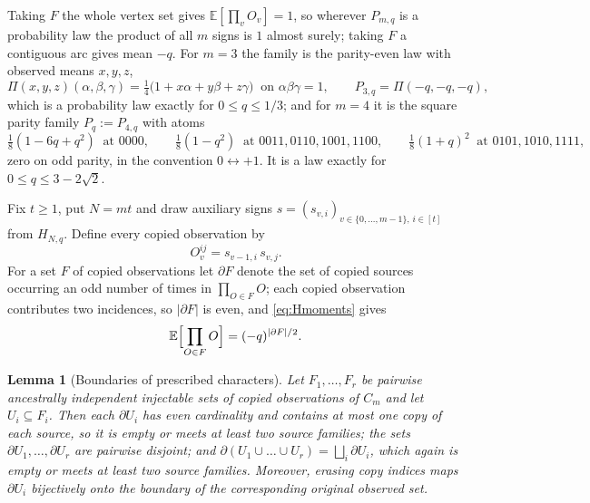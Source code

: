 \documentclass[11pt]{article}
\theoremstyle{plain}
\newtheorem{lemma}[theorem]{Lemma}
\theoremstyle{definition}
\newcommand{\E}{\mathbb E}
\begin{document}
Taking $F$ the whole vertex set gives $\E[\prod_vO_v]=1$, so wherever $P_{m,q}$ is a probability law the product of all $m$ signs is $1$ almost surely; taking $F$ a contiguous arc gives mean $-q$. For $m=3$ the family is the parity-even law with observed means $x,y,z$,
\begin{equation}\label{eq:paritylaw}
\Pi(x,y,z)(\alpha,\beta,\gamma)=\tfrac14\bigl(1+x\alpha+y\beta+z\gamma\bigr)\ \text{ on }\alpha\beta\gamma=1,\qquad P_{3,q}=\Pi(-q,-q,-q),
\end{equation}
which is a probability law exactly for $0\le q\le1/3$; and for $m=4$ it is the square parity family $P_q:=P_{4,q}$ with atoms
\begin{equation}\label{eq:squaretarget}
\tfrac18(1-6q+q^2)\ \text{ at }0000,\qquad
\tfrac18(1-q^2)\ \text{ at }0011,0110,1001,1100,\qquad
\tfrac18(1+q)^2\ \text{ at }0101,1010,1111,
\end{equation}
zero on odd parity, in the convention $0\leftrightarrow+1$. It is a law exactly for $0\le q\le3-2\sqrt2$.

Fix $t\ge1$, put $N=mt$ and draw auxiliary signs $s=(s_{v,i})_{v\in\{0,\dots,m-1\},\,i\in[t]}$ from $H_{N,q}$. Define every copied observation by
\begin{equation}\label{eq:cyclewitness}
O_v^{ij}=s_{v-1,i}\,s_{v,j}.
\end{equation}
For a set $F$ of copied observations let $\partial F$ denote the set of copied sources occurring an odd number of times in $\prod_{O\in F}O$; each copied observation contributes two incidences, so $|\partial F|$ is even, and \eqref{eq:Hmoments} gives
\begin{equation}\label{eq:masterchar}
\E\Bigl[\prod_{O\in F}O\Bigr]=(-q)^{|\partial F|/2}.
\end{equation}

\begin{lemma}[Boundaries of prescribed characters]\label{lem:boundary}
Let $F_1,\dots,F_r$ be pairwise ancestrally independent injectable sets of copied observations of $C_m$ and let $U_i\subseteq F_i$. Then each $\partial U_i$ has even cardinality and contains at most one copy of each source, so it is empty or meets at least two source families; the sets $\partial U_1,\dots,\partial U_r$ are pairwise disjoint; and $\partial(U_1\cup\dots\cup U_r)=\bigsqcup_i\partial U_i$, which again is empty or meets at least two source families. Moreover, erasing copy indices maps $\partial U_i$ bijectively onto the boundary of the corresponding original observed set.
\end{lemma}
\end{document}

